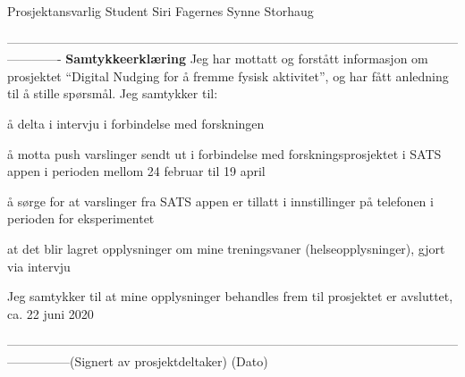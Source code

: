 Prosjektansvarlig                                       									Student
Siri Fagernes																					Synne Storhaug
 
 
-------------------------------------------------------------------------------------------------------------------------
\textbf{Samtykkeerklæring}
Jeg har mottatt og forstått informasjon om prosjektet “Digital Nudging for å fremme fysisk aktivitet”, og har fått anledning til å stille spørsmål. Jeg samtykker til:
 
 \begin{todolist}
    \item å delta i intervju i forbindelse med forskningen
    \item å motta push varslinger sendt ut i forbindelse med forskningsprosjektet i SATS appen i perioden mellom 24 februar til 19 april
       \item å sørge for at varslinger fra SATS appen er tillatt i innstillinger på telefonen i perioden for eksperimentet 
          \item at det blir lagret opplysninger om mine treningsvaner (helseopplysninger), gjort via intervju       
\end{todolist}

Jeg samtykker til at mine opplysninger behandles frem til prosjektet er avsluttet, ca. 22 juni 2020
 
 
---------------------------------------------------------------------------------------------------------------------------(Signert av prosjektdeltaker) 							(Dato)

